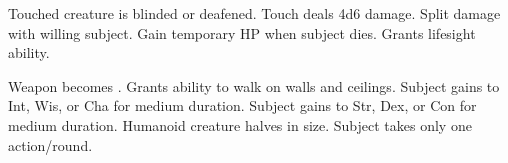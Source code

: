 \begin{swspelllist}
   Touched creature is blinded or deafened.
   Touch deals 4d6 damage.
   Split damage with willing subject.
   Gain temporary HP when subject dies.
   Grants lifesight ability. 

   Weapon becomes .
   Grants ability to walk on walls and ceilings.
   Subject gains  to Int, Wis, or Cha for medium duration.
   Subject gains  to Str, Dex, or Con for medium duration.
   Humanoid creature halves in size.
   Subject takes only one action/round.
\end{swspelllist}

